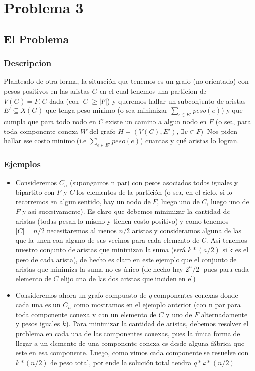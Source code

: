 \documentclass[A4paper,oneside,fleqn,11pt]{article}
\theoremstyle{definition}
\begin{document}
\section{Problema 3}

\subsection{El Problema}

\subsubsection{Descripcion}
Planteado de otra forma, la situación que tenemos es un grafo (no orientado) con pesos positivos en las aristas $G$ en el cual tenemos una particion de $V(G)={F,C}$ dada  (con $|C| \geq |F|$) y queremos hallar un subconjunto de aristas $E' \subseteq X(G)$ que tenga peso minimo (o sea minimizar $\sum\limits_{e \in E'} {peso(e)}$) y que cumpla que para todo nodo en $C$ existe un camino a algun nodo en $F$ (o sea, para toda componente conexa $W$ del  grafo $H=(V(G),E')$,  $\exists v \in F$). Nos piden hallar ese costo minimo (i.e $\sum\limits_{e \in E'} {peso(e)}$) cuantas y qué aristas lo logran.
\subsubsection{Ejemplos}

\begin{itemize}
\item Consideremos $C_{n}$ (supongamos n par) con pesos asociados todos iguales y bipartito con $F$ y $C$ los elementos de la partición (o sea, en el ciclo, si lo recorremos en algun sentido, hay un nodo de $F$, luego uno de $C$, luego uno de $F$ y así sucesivamente). Es claro que debemos minimizar la cantidad de aristas (todas pesan lo mismo y tienen costo positivo) y como tenemos $|C|=n/2$ necesitaremos al menos $n/2$ aristas y consideramos alguna de las que la unen con alguno de sus vecinos para cada elemento de $C$. Así tenemos nuestro conjunto de aristas que minimizan la suma (será $k*(n/2)$ si k es el peso de cada arista), de hecho es claro en este ejemplo que el conjunto de aristas que minimiza la suma no es único (de hecho hay $2^n/2$ -pues para cada elemento de $C$ elijo una de las dos aristas que inciden en el)

\item Consideremos ahora un grafo compuesto de $q$ componentes conexas donde cada una es un $C_{n}$ como mostramos en el ejemplo anterior (con n par para toda componente conexa y con un elemento de $C$ y uno de $F$ alternadamente y pesos iguales $k$). Para minimizar la cantidad de aristas, debemos resolver el problema en cada una de las componentes conexas, pues la única forma de llegar a un elemento de una componente conexa es desde alguna fábrica que este en esa componente. Luego, como vimos cada componente se resuelve con $k*(n/2)$ de peso total, por ende la solución total tendra $q*k*(n/2)$
\end{itemize}
\end{document}
